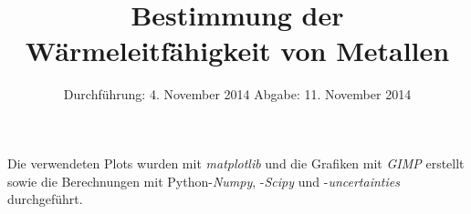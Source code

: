 
\subject{ANFÄNGERPRAKTIKUM V204}
\title{Bestimmung der Wärmeleitfähigkeit von Metallen}
\date{
  Durchführung: 4. November 2014
  \hspace{1em}
  Abgabe: 11. November 2014
}



\maketitle
\thispagestyle{empty}
\newpage



\newpage


\nocite{V101}
\printbibliography
\noindent Die verwendeten Plots wurden mit \textit{matplotlib}\cite{matplotlib} und die Grafiken mit \textit{GIMP}\cite{gimp} erstellt sowie die Berechnungen mit Python-\textit{Numpy}\cite{numpy}, -\textit{Scipy}\cite{scipy} und -\textit{uncertainties}\cite{uncertainties} durchgeführt.

